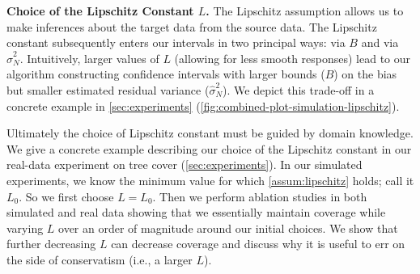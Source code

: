 \textbf{Choice of the Lipschitz Constant $L$.} The Lipschitz assumption allows us to make inferences about the target data from the source data. The Lipschitz constant subsequently enters our intervals in two principal ways: via $B$ and via $\hat{\sigma}^2_N$. Intuitively, larger values of $L$ (allowing for less smooth responses) lead to our algorithm constructing confidence intervals with larger bounds ($B$) on the bias but smaller estimated residual variance ($\hat{\sigma}^2_N$). We depict this trade-off in a concrete example in \cref{sec:experiments} (\cref{fig:combined-plot-simulation-lipschitz}).

Ultimately the choice of Lipschitz constant must be guided by domain knowledge. We give a concrete example describing our choice of the Lipschitz constant in our real-data experiment on tree cover (\cref{sec:experiments}). In our simulated experiments, we know the minimum value for which \cref{assum:lipschitz} holds; call it $L_0$. So we first choose $L=L_0$. Then we perform ablation studies in both simulated and real data showing that we essentially maintain coverage while varying $L$ over an order of magnitude around our initial choices. We show that further decreasing $L$ can decrease coverage and discuss why it is useful to err on the side of conservatism (i.e., a larger $L$).

